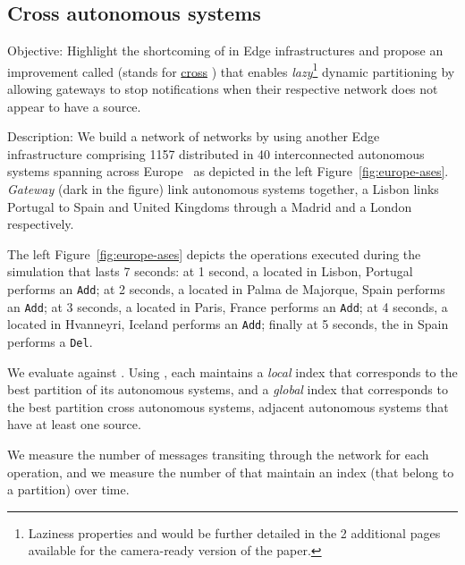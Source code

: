 \subsection{Cross autonomous systems}
\begin{asparadesc}
  \item[Objective:] Highlight the shortcoming of \NAME in Edge
    infrastructures and propose an improvement called \NAMEC (stands
    for \underline{cross} \underline{\NAME}) that enables
    \emph{lazy}\footnote{Laziness properties and \NAMEC would be
    further detailed in the 2 additional pages available for the
    camera-ready version of the paper.} dynamic partitioning by
    allowing gateways to stop notifications when their respective
    network does not appear to have a source.
    
  \item[Description:] We build a network of networks by using another
    Edge infrastructure comprising 1157 \processes distributed in 40
    interconnected autonomous systems spanning across
    Europe~\cite{knight2011internet} as depicted in the left
    Figure~\ref{fig:europe-ases}. \emph{Gateway} \processes (dark in
    the figure) link autonomous systems together, \eg a Lisbon \node
    links Portugal to Spain and United Kingdoms through a Madrid \node
    and a London \node respectively.

    \noindent The left Figure~\ref{fig:europe-ases} depicts the
    operations executed during the simulation that lasts 7 seconds: at
    1 second, a \node located in Lisbon, Portugal performs an
    \texttt{Add}; at 2 seconds, a \node located in Palma de Majorque,
    Spain performs an \texttt{Add}; at 3 seconds, a \node located in
    Paris, France performs an \texttt{Add}; at 4 seconds, a \node
    located in Hvanneyri, Iceland performs an \texttt{Add};
    finally at 5 seconds, the \node in Spain performs a \texttt{Del}.
    
    \noindent We evaluate \NAME against \NAMEC. Using \NAMEC, each
    \process maintains a \emph{local} index that corresponds to the
    best partition of its autonomous systems, and a \emph{global}
    index that corresponds to the best partition cross autonomous
    systems, \ie adjacent autonomous systems that have at least one
    source.
    
    \noindent We measure the number of messages transiting through the
    network for each operation, and we measure the number of
    \processes that maintain an index (\ie that belong to a partition)
    over time.
    

\end{asparadesc}
